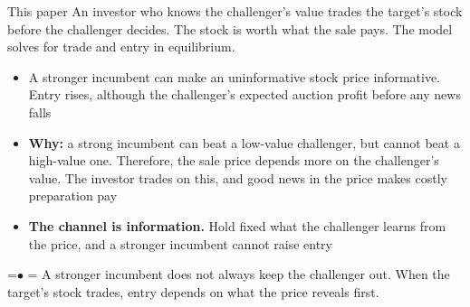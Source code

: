 \documentclass[10pt,aspectratio=169]{beamer}
\newcommand{\TakeawayBody}[1]{\begin{minipage}{\textwidth}\raggedright\normalsize
    \setbox0=\hbox{{\usebeamercolor[fg]{structure}\raise0.7pt\hbox{\scriptsize$\bullet$}}\hspace{0.55em}}%
    \hangindent=\wd0 \hangafter=1 \noindent\box0 #1\par
  \end{minipage}}
\renewcommand{\Takeaway}[2][\ExhibitReadingGap]{\par\vspace{#1}\noindent\TakeawayBody{#2}\par}
\begin{document}
\begin{frame}[label=F2]{This paper}
An investor who knows the challenger's value trades the target's stock before the challenger decides. The stock is worth what the sale pays. The model solves for trade and entry in equilibrium.
\vspace{2pt}
\begin{itemize}\setlength{\itemsep}{5pt}
\item {} A stronger incumbent can make an uninformative stock price informative. Entry rises, although the challenger's expected auction profit before any news falls
\item \textbf{Why:} a strong incumbent can beat a low-value challenger, but cannot beat a high-value one. Therefore, the sale price depends more on the challenger's value. The investor trades on this, and good news in the price makes costly preparation pay
\item \textbf{The channel is information.} Hold fixed what the challenger learns from the price, and a stronger incumbent cannot raise entry
\end{itemize}
\Takeaway[0.6em]{A stronger incumbent does not always keep the challenger out. When the target's stock trades, entry depends on what the price reveals first.}
\end{frame}
\end{document}
